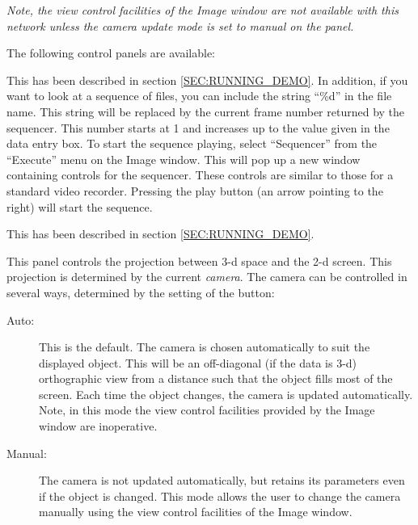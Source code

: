 \begin{center}
{ \em Note, the view control facilities of the Image window are not
available with this network unless the camera update mode is set to
manual on the  panel. }
\end{center}

The following control panels are available:
\begin{description}


This has been described in section \ref{SEC:RUNNING_DEMO}. In addition,
if you want to look at a sequence of files, you can include the string
``\%d'' in the file name. This string will be replaced by the current
frame number returned by the sequencer. This number starts at 1 and
increases up to the value given in the  data
entry box. To start the sequence playing, select ``Sequencer'' from the
``Execute'' menu on the Image window. This will pop up a new window
containing controls for the sequencer. These controls are similar to
those for a standard video recorder. Pressing the play button
(an arrow pointing to the right) will start the sequence.

This has been described in section \ref{SEC:RUNNING_DEMO}.

This panel controls the projection between 3-d space and the 2-d screen.
This projection is determined by the current {\em camera}. The camera can be
controlled in several ways, determined by the setting of the  button:

\begin{description}

\item [Auto:]
This is the default. The camera is chosen automatically to suit the
displayed object. This will be an off-diagonal (if the data is 3-d)
orthographic view from a distance such that the object fills most of the
screen. Each time the object changes, the camera is updated
automatically. Note, in this mode the view control facilities provided
by the Image window are inoperative.

\item[Manual:]
The camera is not updated automatically, but retains its parameters even
if the object is changed.  This mode allows the user to change the camera
manually using the view control facilities of the Image window.


\end{description}
\end{description}
